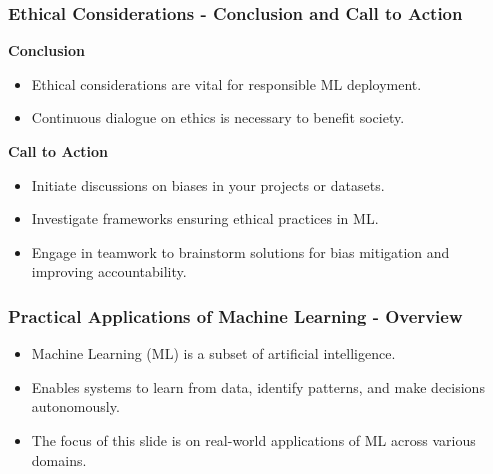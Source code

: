 \documentclass[aspectratio=169]{beamer}
\begin{document}
\begin{frame}[fragile]
    \frametitle{Ethical Considerations - Conclusion and Call to Action}

    \textbf{Conclusion}
    \begin{itemize}
        \item Ethical considerations are vital for responsible ML deployment.
        \item Continuous dialogue on ethics is necessary to benefit society.
    \end{itemize}

    \textbf{Call to Action}
    \begin{itemize}
        \item Initiate discussions on biases in your projects or datasets.
        \item Investigate frameworks ensuring ethical practices in ML.
        \item Engage in teamwork to brainstorm solutions for bias mitigation and improving accountability.
    \end{itemize}
\end{frame}

\begin{frame}[fragile]
    \frametitle{Practical Applications of Machine Learning - Overview}
    \begin{itemize}
        \item Machine Learning (ML) is a subset of artificial intelligence.
        \item Enables systems to learn from data, identify patterns, and make decisions autonomously.
        \item The focus of this slide is on real-world applications of ML across various domains.
    \end{itemize}
\end{frame}
\end{document}
